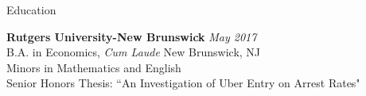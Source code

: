 \documentclass{resume} %
\begin{document}

\begin{rSection}{Education}

{\bf Rutgers University-New Brunswick} \hfill {\em May 2017} \\ 
B.A. in Economics, \emph{Cum Laude} \hfill {New Brunswick, NJ} \\
Minors in Mathematics and English  \\
Senior Honors Thesis: ``An Investigation of Uber Entry on Arrest Rates"
\end{rSection}
\end{document}
